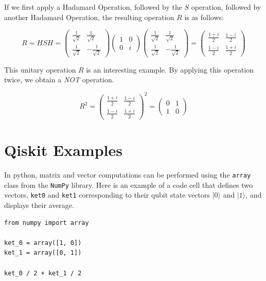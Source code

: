 \documentclass[svgnames]{article}     %
\begin{document}
If we first apply a Hadamard Operation, followed by the $S$ operation, followed by another Hadamard Operation, the resulting operation $R$ is as follows: 

\[
R = HSH = \begin{pmatrix}
  \frac{1}{\sqrt{2}} & \frac{1}{\sqrt{2}} \\[4px]
  \frac{1}{\sqrt{2}} & -\frac{1}{\sqrt{2}} 
\end{pmatrix} \begin{pmatrix}
  1 & 0 \\[4px]
  0 & i 
\end{pmatrix} \begin{pmatrix}
  \frac{1}{\sqrt{2}} & \frac{1}{\sqrt{2}} \\[4px]
  \frac{1}{\sqrt{2}} & -\frac{1}{\sqrt{2}} 
\end{pmatrix}  = \begin{pmatrix}
  \frac{1+i}{2} & \frac{1-i}{2} \\[4px]
  \frac{1-i}{2} & \frac{1+i}{2} 
\end{pmatrix} 
\] \vspace{5px}

This unitary operation $R$ is an interesting example. By applying this operation twice, we obtain a \textit{NOT} operation. 

\[
R^2 = \begin{pmatrix}
  \frac{1+i}{2} & \frac{1-i}{2} \\[4px]
  \frac{1-i}{2} & \frac{1+i}{2} 
\end{pmatrix}^2 = \begin{pmatrix}
  0 & 1 \\[4px]
  1 & 0 
\end{pmatrix} 
\] 
\section{Qiskit Examples}

In python, matrix and vector computations can be performed using the \verb|array| class from the \verb|NumPy| library. Here is an example of a code cell that defines two vectors, \verb|ket0| and \verb|ket1| corresponding to their qubit state vectors $|0\rangle$ and $|1\rangle$, and displays their average.  \\

\begin{lstlisting}
from numpy import array

ket_0 = array([1, 0])
ket_1 = array([0, 1])

ket_0 / 2 + ket_1 / 2 
\end{lstlisting} \vspace{5px}
\end{document}
